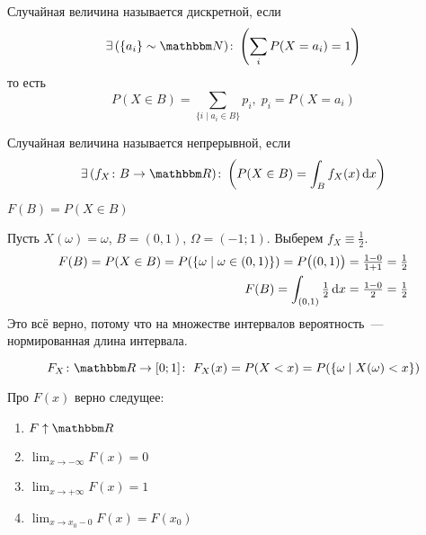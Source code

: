 \documentclass[12pt,timbord]{../../../notes}
\begin{document}
\begin{defn}\label{defn:prob::randscal::disc}
  Случайная величина называется дискретной, если
  \[
    \exists\,(\{a_i\} \sim \N)\colon \left( \sum_{i} P(X = a_i) = 1 \right)
  \]
  то есть 
  \[
    P(X\in B) = \sum_{\{i\mid a_i\in B\}} p_i, \; p_i = P(X = a_i)
  \]
\end{defn}
\begin{defn}\label{defn:prob::randscal::cony}
  Случайная величина называется непрерывной, если
  \[
    \exists\,(f_X\colon B\to \R )\colon \left( P(X\in B) = \int_{B} f_X(x)\, \del x \right)
  \]
\end{defn}
\begin{defn}\label{defn:prob::randscal::distr}
  $F(B) = P(X \in B)$
\end{defn}

\begin{exmp}\label{exmp:prob::randscal::cont}
  Пусть $X(\omega) = \omega$, $B = (0,1)$, $\Omega = (-1;1)$. Выберем  $f_X \equiv \frac{1}{2}$.
  \begin{align*}
    F(B) = P(X\in B) = P(\{\omega \mid \omega \in (0,1)\}) = P\bigl((0,1)\bigr) = \tfrac{1-0}{1+1}
    = \tfrac{1}{2} \\
    F(B) = \int_{(0,1)} \tfrac{1}{2}\, \mathrm{d} x  = \tfrac{1-0}{2} = \tfrac{1}{2}
  \end{align*}
  Это всё верно, потому что на множестве интервалов вероятность~--- нормированная длина интервала.
\end{exmp}

\begin{defn}\label{defn:prob::randscal::distrfun}
  \[
    F_X\colon \R\to [0;1] \colon\; F_X(x) = P(X < x) = P(\{\omega \mid X(\omega) < x \})
  \]
\end{defn}

\begin{prop}\label{prop:prob::randscal::distrfun}
  Про $F(x)$ верно следущее:
  \begin{enumerate}
    \item $F\displaystyle\uparrow \R$
    \item $\displaystyle\lim_{x\to -\infty}F(x) = 0$
    \item $\displaystyle\lim_{x\to +\infty}F(x) = 1$
    \item $\displaystyle\lim_{x\to x_0-0}F(x) = F(x_0)$
  \end{enumerate}
\end{prop}
\end{document}
